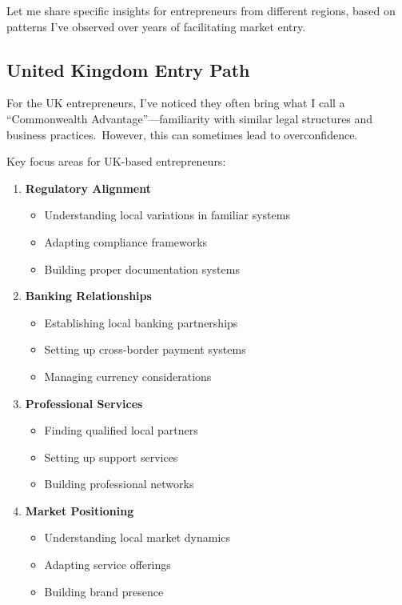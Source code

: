Let me share specific insights for entrepreneurs from different regions, based on patterns I've observed over years of facilitating market entry.

\subsection{United Kingdom Entry Path}\label{subsec:united-kingdom-entry-path}

For the UK entrepreneurs, I've noticed they often bring what I call a ``Commonwealth Advantage''—familiarity with similar legal structures and business practices.\ However, this can sometimes lead to overconfidence.

Key focus areas for UK-based entrepreneurs:

\begin{enumerate}
    \item \textbf{Regulatory Alignment}
    \begin{itemize}
        \item Understanding local variations in familiar systems
        \item Adapting compliance frameworks
        \item Building proper documentation systems
    \end{itemize}
    \item \textbf{Banking Relationships}
    \begin{itemize}
        \item Establishing local banking partnerships
        \item Setting up cross-border payment systems
        \item Managing currency considerations
    \end{itemize}
    \item \textbf{Professional Services}
    \begin{itemize}
        \item Finding qualified local partners
        \item Setting up support services
        \item Building professional networks
    \end{itemize}
    \item \textbf{Market Positioning}
    \begin{itemize}
        \item Understanding local market dynamics
        \item Adapting service offerings
        \item Building brand presence
    \end{itemize}
\end{enumerate}

